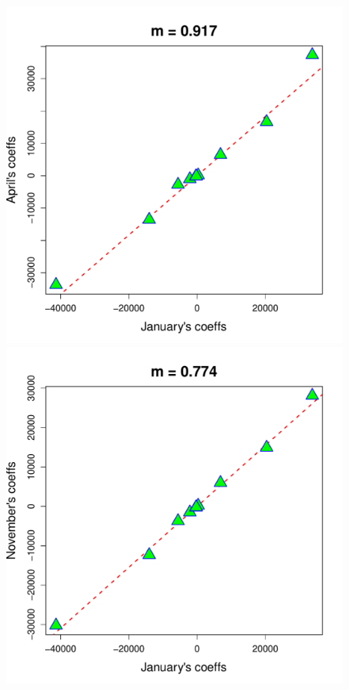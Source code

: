 \documentclass[a4paper, 12pt]{article}
\begin{document}
\begin{figure}
 \includegraphics[scale=\scale]{Compare_LRs/LR_Jan_Apr}\hspace{-1ex}
 \includegraphics[scale=\scale]{Compare_LRs/LR_Jan_Nov}\hspace{-1ex}

\end{figure}
\end{document}
